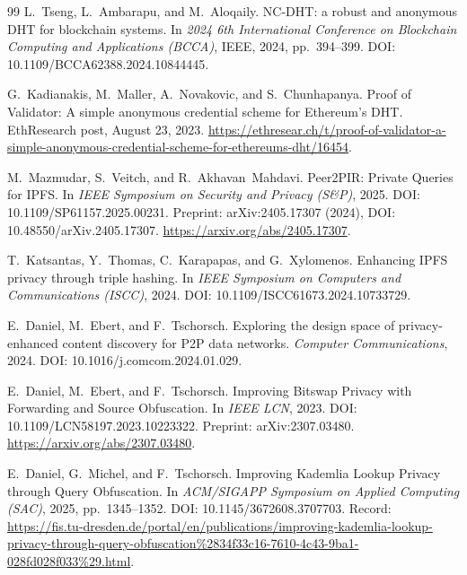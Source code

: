 \documentclass[11pt]{article}
\begin{document}
\begin{thebibliography}{99}
L.~Tseng, L.~Ambarapu, and M.~Aloqaily.
\newblock NC-DHT: a robust and anonymous DHT for blockchain systems.
\newblock In \emph{2024 6th International Conference on Blockchain Computing and Applications (BCCA)}, IEEE, 2024, pp.~394--399.
\newblock DOI: 10.1109/BCCA62388.2024.10844445.

G.~Kadianakis, M.~Maller, A.~Novakovic, and S.~Chunhapanya.
\newblock Proof of Validator: A simple anonymous credential scheme for Ethereum's DHT.
\newblock EthResearch post, August 23, 2023.
\newblock \url{https://ethresear.ch/t/proof-of-validator-a-simple-anonymous-credential-scheme-for-ethereums-dht/16454}.

M.~Mazmudar, S.~Veitch, and R.~Akhavan~Mahdavi.
\newblock Peer2PIR: Private Queries for {IPFS}.
\newblock In \emph{IEEE Symposium on Security and Privacy (S\&P)}, 2025.
\newblock DOI: 10.1109/SP61157.2025.00231.
\newblock Preprint: arXiv:2405.17307 (2024), DOI: 10.48550/arXiv.2405.17307.
\newblock \url{https://arxiv.org/abs/2405.17307}.

T.~Katsantas, Y.~Thomas, C.~Karapapas, and G.~Xylomenos.
\newblock Enhancing IPFS privacy through triple hashing.
\newblock In \emph{IEEE Symposium on Computers and Communications (ISCC)}, 2024.
\newblock DOI: 10.1109/ISCC61673.2024.10733729.

E.~Daniel, M.~Ebert, and F.~Tschorsch.
\newblock Exploring the design space of privacy-enhanced content discovery for P2P data networks.
\newblock \emph{Computer Communications}, 2024.
\newblock DOI: 10.1016/j.comcom.2024.01.029.

E.~Daniel, M.~Ebert, and F.~Tschorsch.
\newblock Improving Bitswap Privacy with Forwarding and Source Obfuscation.
\newblock In \emph{IEEE LCN}, 2023.
\newblock DOI: 10.1109/LCN58197.2023.10223322.
\newblock Preprint: arXiv:2307.03480.
\newblock \url{https://arxiv.org/abs/2307.03480}.

E.~Daniel, G.~Michel, and F.~Tschorsch.
\newblock Improving {Kademlia} Lookup Privacy through Query Obfuscation.
\newblock In \emph{ACM/SIGAPP Symposium on Applied Computing (SAC)}, 2025, pp.~1345--1352.
\newblock DOI: 10.1145/3672608.3707703.
\newblock Record: \url{https://fis.tu-dresden.de/portal/en/publications/improving-kademlia-lookup-privacy-through-query-obfuscation%2834f33c16-7610-4c43-9ba1-028fd028f033%29.html}.


\end{thebibliography}
\end{document}
